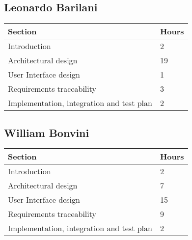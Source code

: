 {\color{secblue}\subsection{Leonardo Barilani}}
\begin{table}[H]
\begin{tabular}{ll}
\hline
\multicolumn{1}{|l|}{Section} & \multicolumn{1}{l|}{Hours} \\ \hline
\multicolumn{1}{|l|}{Introduction} & \multicolumn{1}{l|}{2} \\ \hline
\multicolumn{1}{|l|}{Architectural design}            & \multicolumn{1}{l|}{19}     \\ \hline
\multicolumn{1}{|l|}{User Interface design}     & \multicolumn{1}{l|}{1}     \\ \hline
\multicolumn{1}{|l|}{Requirements traceability}   & \multicolumn{1}{l|}{3}     \\ \hline
\multicolumn{1}{|l|}{Implementation, integration and test plan}   & \multicolumn{1}{l|}{2}     \\ \hline         
\end{tabular}
\end{table}


{\color{secblue}\subsection{William Bonvini}}
\begin{table}[H]
\begin{tabular}{ll}
\hline
\multicolumn{1}{|l|}{Section} & \multicolumn{1}{l|}{Hours} \\ \hline
\multicolumn{1}{|l|}{Introduction} & \multicolumn{1}{l|}{2} \\ \hline
\multicolumn{1}{|l|}{Architectural design}            & \multicolumn{1}{l|}{7}     \\ \hline
\multicolumn{1}{|l|}{User Interface design}     & \multicolumn{1}{l|}{15}     \\ \hline
\multicolumn{1}{|l|}{Requirements traceability}   & \multicolumn{1}{l|}{9}     \\ \hline
\multicolumn{1}{|l|}{Implementation, integration and test plan}   & \multicolumn{1}{l|}{2}           \\ \hline     
\end{tabular}
\end{table}


